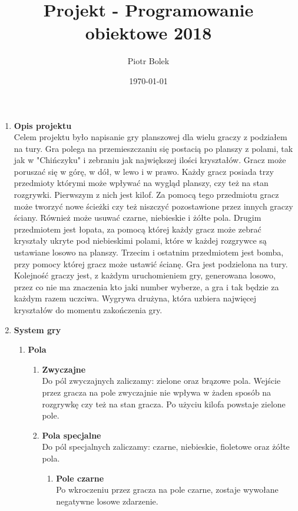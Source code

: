 \documentclass[a4paper]{article}
\title{Projekt - Programowanie obiektowe 2018}
\author{Piotr Bolek}
\date{\today}
\begin{document}
	
	\begin{enumerate}
		\huge \item \textbf{Opis projektu} \\
			\normalsize 
				Celem projektu było napisanie gry planszowej dla wielu graczy z podziałem na tury. Gra polega na przemieszczaniu się postacią po planszy z 
				polami, tak jak w "Chińczyku" i zebraniu jak największej ilości kryształów. Gracz może poruszać się w górę, w dół, w lewo i w prawo. Każdy
				gracz posiada trzy przedmioty którymi może wpływać na wygląd planszy, czy też na stan rozgrywki. Pierwszym z nich jest kilof. Za pomocą 
				tego przedmiotu gracz może tworzyć nowe ścieżki czy też niszczyć pozostawione przez innych graczy ściany. Również może usuwać czarne, 
				niebieskie i żółte pola. Drugim przedmiotem jest łopata, za pomocą której każdy gracz może zebrać kryształy ukryte pod niebieskimi polami, 
				które w każdej rozgrywce są ustawiane losowo na planszy. Trzecim i ostatnim przedmiotem jest bomba, przy pomocy której gracz może 
				ustawić ścianę. Gra jest podzielona na tury. Kolejność graczy jest, z każdym uruchomieniem gry, generowana losowo, przez co nie ma 
				znaczenia kto jaki number wyberze, a gra i tak będzie za każdym razem uczciwa. Wygrywa drużyna, która uzbiera najwięcej kryształów 
				do momentu zakończenia gry.
			\huge \item \textbf{System gry}
				\begin{enumerate}
					\Large \item \textbf {Pola}
						\begin{enumerate}
							\large \item \textbf {Zwyczajne} \\
								\normalsize
									Do pól zwyczajnych zaliczamy: zielone oraz brązowe pola. Wejście przez gracza na pole zwyczajnie nie wpływa w żaden
									sposób na rozgrywkę czy też na stan gracza. Po użyciu kilofa powstaje zielone pole. \\
							\large \item \textbf {Pola specjalne} \\
								\normalsize
									Do pól specjalnych zaliczamy: czarne, niebieskie, fioletowe oraz żółte pola. \\
									\begin{enumerate}
										\large \item \textbf {Pole czarne} \\
											\normalsize 
												Po wkroczeniu przez gracza na pole czarne, zostaje wywołane negatywne losowe zdarzenie.

\end{enumerate}
\end{enumerate}
\end{enumerate}
\end{enumerate}
\end{document}

